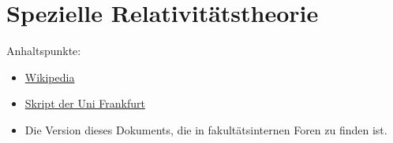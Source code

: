 \chapter{Spezielle Relativitätstheorie}\label{SRT}
Anhaltspunkte:
\begin{itemize}
	\item \href{https://de.wikipedia.org/wiki/Spezielle_Relativit%C3%A4tstheorie}{Wikipedia}
	\item \href{https://itp.uni-frankfurt.de/~luedde/E-Skript/Elektrodynamik/SpezRel.pdf}{Skript der Uni Frankfurt}
	\item Die Version dieses Dokuments, die in fakultätsinternen Foren zu finden ist.
\end{itemize}


